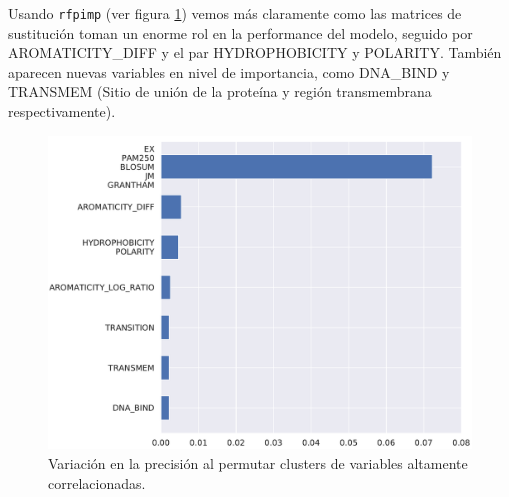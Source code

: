 Usando \texttt{rfpimp} (ver figura \ref{fig:importances_structural_cluster}) vemos más claramente como las matrices de sustitución toman un enorme rol en la performance del modelo, seguido por AROMATICITY\_DIFF y el par HYDROPHOBICITY y POLARITY. También aparecen nuevas variables en nivel de importancia, como DNA\_BIND y TRANSMEM (Sitio de unión de la proteína y región transmembrana respectivamente).


\begin{figure}[H]
    \centering
    \includegraphics[scale=0.7]{documents/latex/figures/3/structural/structural_importance_cluster.pdf}
    \caption{Variación en la precisión al permutar clusters de variables altamente correlacionadas.}
    \label{fig:importances_structural_cluster}
\end{figure}


\newpage

